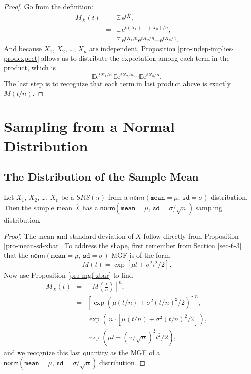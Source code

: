 \documentclass[captions=tableheading]{scrbook}
\begin{document}
\begin{proof}
Go from the definition:
\begin{eqnarray*}
M_{\overline{X}}(t) & = & \mathbb{E}\,\mathrm{e}^{t\overline{X}},\\
 & = & \mathbb{E}\,\mathrm{e}^{t(X_{1}+\cdots+X_{n})/n},\\
 & = & \mathbb{E}\,\mathrm{e}^{tX_{1}/n}\mathrm{e}^{tX_{2}/n}\cdots\mathrm{e}^{tX_{n}/n}.
\end{eqnarray*}
And because \(X_{1}\), \(X_{2}\), \ldots{}, \(X_{n}\) are independent, Proposition \ref{pro-indep-implies-prodexpect} allows us to distribute the expectation among each term in the product, which is
\[
\mathbb{E}\mathrm{e}^{tX_{1}/n}\,\mathbb{E}\mathrm{e}^{tX_{2}/n}\cdots\mathbb{E}\mathrm{e}^{tX_{n}/n}.
\]
The last step is to recognize that each term in last product above is exactly \(M(t/n)\).
\end{proof}
\section{Sampling from a Normal Distribution}
\label{sec-8-2}
\label{sec-sampling-from-normal-dist}
\subsection{The Distribution of the Sample Mean}
\label{sec-8-2-1}
\label{sub-samp-mean-dist-of}


\begin{prop}
Let \(X_{1}\), \(X_{2}\), \ldots{}, \(X_{n}\) be a \(SRS(n)\) from a \(\mathsf{norm}(\mathtt{mean}=\mu,\,\mathtt{sd}=\sigma)\) distribution. Then the sample mean \(\overline{X}\) has a \(\mathsf{norm}(\mathtt{mean}=\mu,\,\mathtt{sd}=\sigma/\sqrt{n})\) sampling distribution.
\end{prop}

\begin{proof}
The mean and standard deviation of \(\overline{X}\) follow directly from Proposition \ref{pro-mean-sd-xbar}. To address the shape, first remember from Section \ref{sec-6-3} that the \(\mathsf{norm}(\mathtt{mean}=\mu,\,\mathtt{sd}=\sigma)\) MGF is of the form
\[
M(t)=\exp\left[ \mu t+\sigma^{2}t^{2}/2\right] .
\]
Now use Proposition \ref{pro-mgf-xbar} to find
\begin{eqnarray*}
M_{\overline{X}}(t) & = & \left[M\left(\frac{t}{n}\right)\right]^{n},\\
 & = & \left[\exp\left( \mu(t/n)+\sigma^{2}(t/n)^{2}/2\right) \right]^{n},\\
 & = & \exp\left( \, n\cdot\left[\mu(t/n)+\sigma^{2}(t/n)^{2}/2\right]\right) ,\\
 & = & \exp\left( \mu t+(\sigma/\sqrt{n})^{2}t^{2}/2\right),
\end{eqnarray*}
and we recognize this last quantity as the MGF of a \(\mathsf{norm}(\mathtt{mean}=\mu,\,\mathtt{sd}=\sigma/\sqrt{n})\) distribution.
\end{proof}
\end{document}
